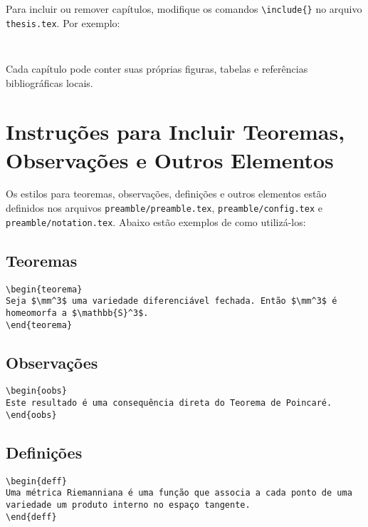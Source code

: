 \documentclass[a4paper,12pt]{article}
\begin{document}
Para incluir ou remover capítulos, modifique os comandos \texttt{\textbackslash include\{\}} no arquivo \texttt{thesis.tex}. Por exemplo:
\begin{verbatim}


\end{verbatim}

Cada capítulo pode conter suas próprias figuras, tabelas e referências bibliográficas locais.

\section*{Instruções para Incluir Teoremas, Observações e Outros Elementos}

Os estilos para teoremas, observações, definições e outros elementos estão definidos nos arquivos \newline \texttt{preamble/preamble.tex}, \texttt{preamble/config.tex} e \texttt{preamble/notation.tex}. Abaixo estão exemplos de como utilizá-los:

\subsection*{Teoremas}
\begin{verbatim}
\begin{teorema}
Seja $\mm^3$ uma variedade diferenciável fechada. Então $\mm^3$ é homeomorfa a $\mathbb{S}^3$.
\end{teorema}
\end{verbatim}

\subsection*{Observações}
\begin{verbatim}
\begin{oobs}
Este resultado é uma consequência direta do Teorema de Poincaré.
\end{oobs}
\end{verbatim}

\subsection*{Definições}
\begin{verbatim}
\begin{deff}
Uma métrica Riemanniana é uma função que associa a cada ponto de uma variedade um produto interno no espaço tangente.
\end{deff}
\end{verbatim}
\end{document}
